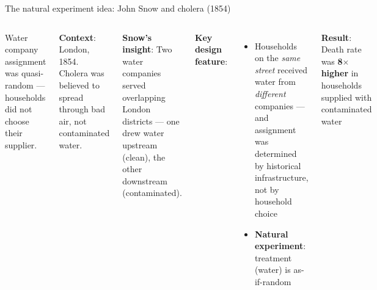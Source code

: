 \documentclass[aspectratio=169, 12pt]{beamer}
\newcommand{\redt}[1]{\textcolor{emphred}{#1}}
\begin{document}
\begin{frame}{The natural experiment idea: John Snow and cholera (1854)}
  \vspace{-0.3em}
  \begin{columns}[T]
    \centering
  
    \vspace{0.5em}
    {\scriptsize Water company assignment was \redt{quasi-random} --- households did not choose their supplier.}
  
    \vspace{-0.3em}
    \textbf{Context}: London, 1854. Cholera was believed to spread through bad air, not contaminated water.
  
    \vspace{0.3em}
    \textbf{Snow's insight}: Two water companies served overlapping London districts --- one drew water upstream (clean), the other downstream (contaminated).
  
    \vspace{0.3em}  
    \textbf{Key design feature}:
    \begin{itemize}\setlength\itemsep{0.15em}
      \item Households on the \emph{same street} received water from \emph{different} companies --- and assignment was determined by historical infrastructure, \redt{not by household choice}
      \item \textbf{Natural experiment}: treatment (water) is as-if-random
    \end{itemize}
  
    \textbf{Result}: Death rate was \textbf{8$\times$ higher} in households supplied with contaminated water
  \end{columns}
  \end{frame}
\end{document}
